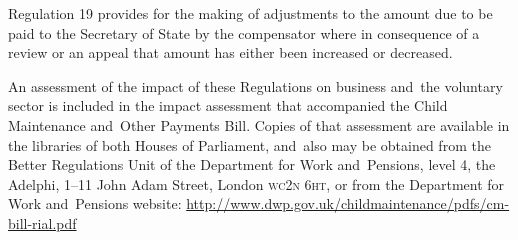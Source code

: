 \documentclass[12pt,a4paper]{article}
\begin{document}
Regulation 19 provides for the making of adjustments to the amount due to be paid to the Secretary of State by the compensator where in consequence of a review or an appeal that amount has either been increased or decreased.

An assessment of the impact of these Regulations on business and~the voluntary sector is included in the impact assessment that accompanied the Child Maintenance and~Other Payments Bill. Copies of that assessment are available in the libraries of both Houses of Parliament, and~also may be obtained from the Better Regulations Unit of the Department for Work and~Pensions, level 4, the Adelphi, 1--11 John Adam Street, London \textsc{\lowercase{WC2N 6HT}}, or from the Department for Work and~Pensions website: \url{http://www.dwp.gov.uk/childmaintenance/pdfs/cm-bill-rial.pdf}
\end{document}
